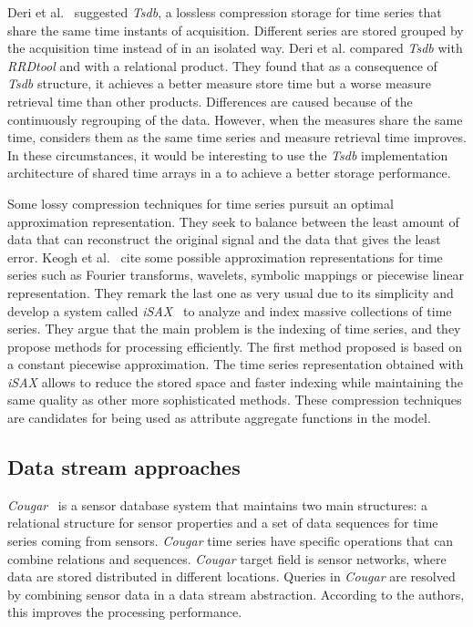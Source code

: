 Deri et al.~\cite{deri12:tsdb_compressed_database} suggested
\emph{Tsdb}, a lossless compression storage  for time
series that share the same time instants of acquisition. Different
series are stored grouped by the acquisition time instead of in an
isolated way.  Deri et al. compared \emph{Tsdb} with \emph{RRDtool}
and with a relational product. They found that as a consequence of
\emph{Tsdb} structure, it achieves a better measure store time but a
worse measure retrieval time than other products. Differences are
caused because of the continuously regrouping of the data.  However, when the
measures share the same time,  considers them as the same
time series and measure retrieval time improves. In these
circumstances, it would be interesting to use the \emph{Tsdb}
implementation architecture of shared time arrays in a  to
achieve a better storage performance.

Some lossy compression techniques for time series pursuit an optimal
approximation representation. They seek to balance between the least
amount of data that can reconstruct the original signal and the data
that gives the least error. Keogh et al.~\cite{keogh01} cite some
possible approximation representations for time series such as Fourier
transforms, wavelets, symbolic mappings or piecewise linear
representation. They remark the last one as very usual due to its
simplicity and develop a system called
\emph{iSAX}~\cite{keogh08:isax,keogh10:isax} to analyze and index
massive collections of time series. They argue that the main problem
is the indexing of time series, and they propose methods for
processing efficiently. The first method proposed is based on a
constant piecewise approximation. The time series representation
obtained with \emph{iSAX} allows to reduce the stored space and faster
indexing while maintaining the same quality as other more
sophisticated methods.  These compression techniques are candidates
for being used as attribute aggregate functions in the 
model.


\subsection{Data stream approaches}

\emph{Cougar}~\cite{bonnet01} is a sensor database system that
maintains two main structures: a relational structure for sensor
properties and a set of data sequences for time series coming from
sensors. \emph{Cougar} time series have specific operations that can
combine relations and sequences. \emph{Cougar} target field is sensor
networks, where data are stored distributed in different
locations. Queries in \emph{Cougar} are resolved by combining sensor
data in a data stream abstraction. According to the authors, this
improves the processing performance.

